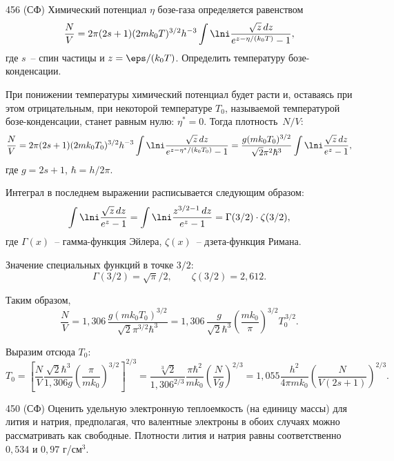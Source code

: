\documentclass[pscyr]{hedwork}
\begin{document}
  \begin{task}{456 (СФ)}{
    Химический потенциал \( \eta \) бозе-газа определяется равенством
    \[
      \frac{N}{V} = 2\pi(2s + 1)(2mk_0 T)^{3/2} h^{-3}
        \int\lni \frac{\sqrt{z}\,dz}{e^{z - \eta / (k_0 T)} - 1},
    \]
    где \( s \)~-- спин частицы и \( z = \eps / (k_0 T) \). Определить
    температуру бозе-кон\-ден\-са\-ции.
  }
  
    При понижении температуры химический потенциал будет расти и, оставаясь
    при этом отрицательным, при некоторой температуре \(T_0 \), называемой
    температурой бозе-конденсации, станет равным нулю: \( \eta^* = 0 \).
    Тогда плотность~\( N / V \):
    \[
      \frac{N}{V} = 2\pi(2s + 1)(2mk_0 T_0)^{3/2} h^{-3}
        \int\lni \frac{\sqrt{z}\,dz}{e^{z - \eta^* / (k_0 T_0)} - 1} =
        \frac{g(mk_0 T_0)^{3/2}}{\sqrt{2}\pi^2\hbar^3}
        \int\lni \frac{\sqrt{z}\,dz}{e^z - 1},
    \]
    где \( g = 2s + 1 \), \( \hbar = h / 2\pi \).
    
    Интеграл в последнем выражении расписывается следующим образом:
    \[
      \int\lni \frac{\sqrt{z}\,dz}{e^z - 1} =
        \int\lni \frac{z^{3/2 - 1}\,dz}{e^z - 1} = \Gamma(3/2)\cdot\zeta(3/2),
    \]
    где \( \Gamma(x) \)~-- гамма-функция Эйлера, \( \zeta(x) \)~--
    дзета-функция Римана.
      
    Значение специальных функций в точке \( 3/2 \):
    \[
      \Gamma(3/2) = \sqrt{\pi} / 2, \qquad \zeta(3/2) = 2,\!612.
    \]
    
    Таким образом,
    \[
      \frac{N}{V} = 1,\!306\,\frac{g(mk_0 T_0)^{3/2}}{\sqrt{2}\pi^{3/2}\hbar^3}
        = 1,\!306\,\frac{g}{\sqrt{2}\hbar^3}
        \left(\frac{mk_0}{\pi}\right)^{\!\!3/2}\!\!T_0^{\,3/2}.
    \]
    
    Выразим отсюда \( T_0 \):
    \[
      T_0 = \left[\frac{N}{V}\frac{\sqrt{2}\hbar^3}{1,\!306 g}
        \left(\frac{\pi}{mk_0}\right)^{\!\!3/2}\right]^{\!\!2/3} \!\!\! =
        \frac{\sqrt[3]{2}}{1,\!306^{2/3}}\frac{\pi\hbar^2}{mk_0}
        \left(\frac{N}{Vg}\right)^{\!\!2/3} \!\!\! =
        1,\!055\frac{h^2}{4\pi mk_0}
        \left(\frac{N}{V(2s + 1)}\right)^{\!\!2/3}\!\!.
    \]

  \end{task}

  \begin{task*}{450 (СФ)}{
    Оценить удельную электронную теплоемкость (на единицу массы) для лития и
    натрия, предполагая, что валентные электроны в обоих случаях можно
    рассматривать как свободные. Плотности лития и натрия равны соответственно
    \( 0,\!534 \) и \( 0,\!97 \) г/см\( ^3 \).
  }
  
    

  \end{task*}
\end{document}

